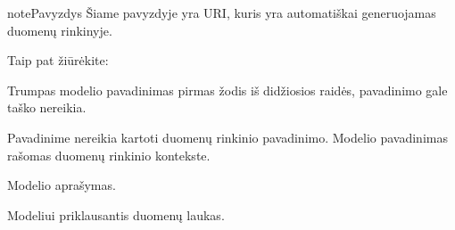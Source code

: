 \documentclass[letterpaper,10pt,lithuanian]{sphinxmanual}
\begin{document}
\begin{fulllineitems}
\begin{sphinxadmonition}{note}{Pavyzdys}
\sphinxAtStartPar
Šiame pavyzdyje  yra URI, kuris yra automatiškai
generuojamas  duomenų rinkinyje.
\end{sphinxadmonition}


\begin{sphinxseealso}{Taip pat žiūrėkite:}

\sphinxAtStartPar
{\hyperref[\detokenize{zodynai:vocab}]{}}


\end{sphinxseealso}


\end{fulllineitems}


\begin{fulllineitems}
\label{\detokenize{dimensijos:model.title}}
\pysigstartsignatures
{}
\pysigstopsignatures
\sphinxAtStartPar
Trumpas modelio pavadinimas pirmas žodis iš didžiosios raidės, pavadinimo
gale taško nereikia.

\sphinxAtStartPar
Pavadinime nereikia kartoti duomenų rinkinio pavadinimo. Modelio
pavadinimas rašomas duomenų rinkinio kontekste.

\end{fulllineitems}


\begin{fulllineitems}
\label{\detokenize{dimensijos:model.description}}
\pysigstartsignatures
{}
\pysigstopsignatures
\sphinxAtStartPar
Modelio aprašymas.

\end{fulllineitems}


\begin{fulllineitems}
\label{\detokenize{dimensijos:model.property}}
\pysigstartsignatures
{}
\pysigstopsignatures
\sphinxAtStartPar
Modeliui priklausantis duomenų laukas.

\end{fulllineitems}
\end{document}
